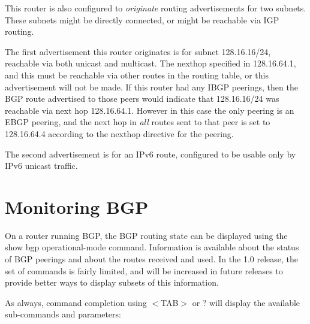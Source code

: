This router is also configured to {\it originate} routing
advertisements for two subnets.  These subnets might be directly
connected, or might be reachable via IGP routing.

The first advertisement this router originates is for subnet
128.16.16/24, reachable via both unicast and multicast.  The nexthop
specified in 128.16.64.1, and this must be reachable via other routes
in the routing table, or this advertisement will not be made.  If this
router had any IBGP peerings, then the BGP route advertised to those
peers would indicate that 128.16.16/24 was reachable via next hop
128.16.64.1. However in this case the only peering is an EBGP peering,
and the next hop in {\it all} routes sent to that peer is set to
128.16.64.4 according to the {\stt nexthop} directive for the peering.

The second advertisement is for an IPv6 route, configured to be usable
only by IPv6 unicast traffic.

\newpage
\section{Monitoring BGP}

On a router running BGP, the BGP routing state can be displayed using
the {\stt show bgp} operational-mode command.  Information is available
about the status of BGP peerings and about the routes received and
used.  In the 1.0 release, the set of commands is fairly limited, and
will be increased in future releases to provide better ways to display
subsets of this information.

As always, command completion using $<$TAB$>$ or ? will display the
available sub-commands and parameters:

\vspace{0.1in}
\noindent{}

